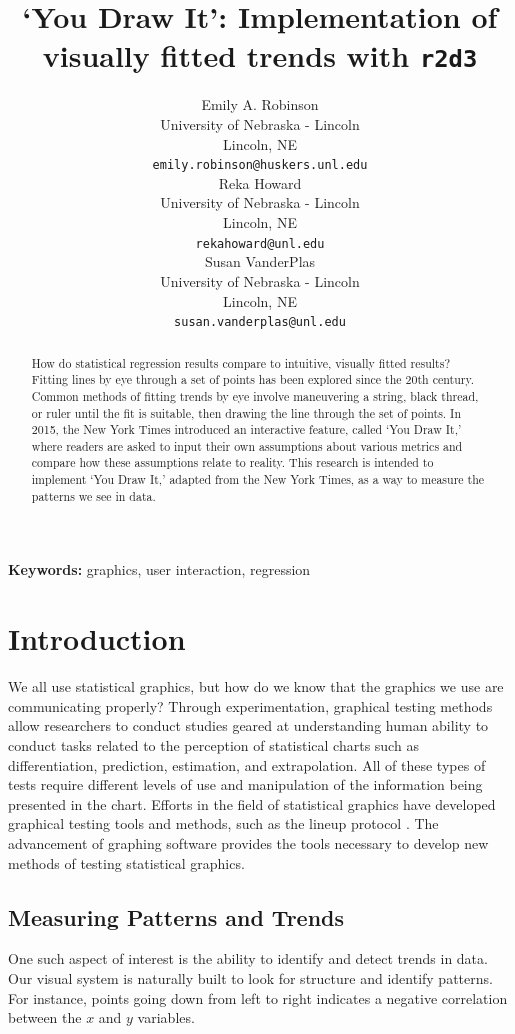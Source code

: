 \documentclass[10pt]{article}
\title{`You Draw It': Implementation of visually fitted trends with
\texttt{r2d3}}
\author{
  Emily A. Robinson \\
  \small{University of Nebraska - Lincoln}\\
  \small{Lincoln, NE} \\
  \small{\tt emily.robinson@huskers.unl.edu} \\\And
 Reka Howard \\
  \small{University of Nebraska - Lincoln}\\
  \small{Lincoln, NE} \\
  \small{\tt rekahoward@unl.edu} \\\And
  Susan VanderPlas \\
  \small{University of Nebraska - Lincoln}\\
  \small{Lincoln, NE} \\
  \small{\tt susan.vanderplas@unl.edu} \\}
\date{}
\begin{document}
\maketitle
\begin{abstract}
How do statistical regression results compare to intuitive, visually
fitted results? Fitting lines by eye through a set of points has been
explored since the 20th century. Common methods of fitting trends by eye
involve maneuvering a string, black thread, or ruler until the fit is
suitable, then drawing the line through the set of points. In 2015, the
New York Times introduced an interactive feature, called `You Draw It,'
where readers are asked to input their own assumptions about various
metrics and compare how these assumptions relate to reality. This
research is intended to implement `You Draw It,' adapted from the New
York Times, as a way to measure the patterns we see in data.
\end{abstract}

{\bf Keywords:} graphics, user interaction, regression

\section{Introduction}

We all use statistical graphics, but how do we know that the graphics we
use are communicating properly? Through experimentation, graphical
testing methods allow researchers to conduct studies geared at
understanding human ability to conduct tasks related to the perception
of statistical charts such as differentiation, prediction, estimation,
and extrapolation. All of these types of tests require different levels
of use and manipulation of the information being presented in the chart.
Efforts in the field of statistical graphics have developed graphical
testing tools and methods, such as the lineup protocol
\cite{buja2009statistical}. The advancement of graphing software
provides the tools necessary to develop new methods of testing
statistical graphics.

\subsection{Measuring Patterns and Trends}

One such aspect of interest is the ability to identify and detect trends
in data. Our visual system is naturally built to look for structure and
identify patterns. For instance, points going down from left to right
indicates a negative correlation between the \(x\) and \(y\) variables.
\end{document}
